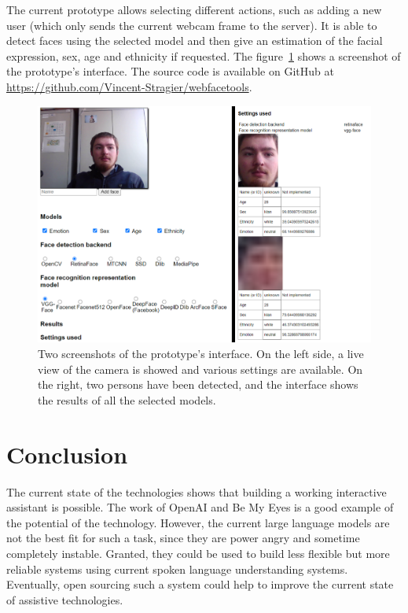 \documentclass[sigconf]{acmart}
\begin{document}
The current prototype allows selecting different actions, such as adding a new user (which only sends the current webcam frame to the server). It is able to detect faces using the selected model and then give an estimation of the facial expression, sex, age and ethnicity if requested. The figure~\ref{fig:facial_recognition_interface} shows a screenshot of the prototype's interface. The source code is available on GitHub at \url{https://github.com/Vincent-Stragier/webfacetools}.

\begin{figure}[!ht]
  \centering
  \includegraphics[width=0.65\linewidth]{figures/proto_interface.pdf}
  \caption{Two screenshots of the prototype's interface. On the left side, a live view of the camera is showed and various settings are available. On the right, two persons have been detected, and the interface shows the results of all the selected models.\label{fig:facial_recognition_interface}}
\end{figure}
\newpage

\section{Conclusion}
The current state of the technologies shows that building a working interactive assistant is possible. The work of OpenAI and Be My Eyes is a good example of the potential of the technology. However, the current large language models are not the best fit for such a task, since they are power angry and sometime completely instable. Granted, they could be used to build less flexible but more reliable systems using current spoken language understanding systems. Eventually, open sourcing such a system could help to improve the current state of assistive technologies.
\end{document}
